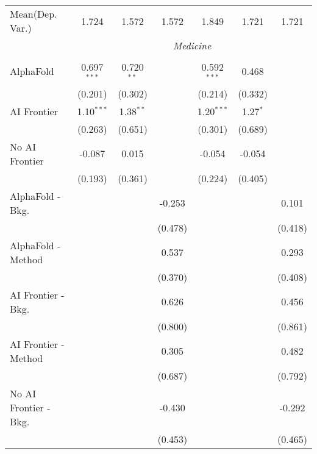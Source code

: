 \begin{tabular}{lcccccc}
Mean(Dep. Var.) & 1.724 & 1.572 & 1.572 & 1.849 & 1.721 & 1.721 \\
 & \multicolumn{6}{c}{\textit{Medicine}} \\ \\
   AlphaFold               & 0.697$^{***}$ & 0.720$^{**}$ &         & 0.592$^{***}$ & 0.468      &   \\   
                           & (0.201)       & (0.302)      &         & (0.214)       & (0.332)    &   \\   
   AI Frontier             & 1.10$^{***}$  & 1.38$^{**}$  &         & 1.20$^{***}$  & 1.27$^{*}$ &   \\   
                           & (0.263)       & (0.651)      &         & (0.301)       & (0.689)    &   \\   
   No AI Frontier          & -0.087        & 0.015        &         & -0.054        & -0.054     &   \\   
                           & (0.193)       & (0.361)      &         & (0.224)       & (0.405)    &   \\   
   AlphaFold - Bkg.        &               &              & -0.253  &               &            & 0.101\\   
                           &               &              & (0.478) &               &            & (0.418)\\   
   AlphaFold - Method      &               &              & 0.537   &               &            & 0.293\\   
                           &               &              & (0.370) &               &            & (0.408)\\   
   AI Frontier - Bkg.      &               &              & 0.626   &               &            & 0.456\\   
                           &               &              & (0.800) &               &            & (0.861)\\   
   AI Frontier - Method    &               &              & 0.305   &               &            & 0.482\\   
                           &               &              & (0.687) &               &            & (0.792)\\   
   No AI Frontier - Bkg.   &               &              & -0.430  &               &            & -0.292\\   
                           &               &              & (0.453) &               &            & (0.465)\\   

\end{tabular}
